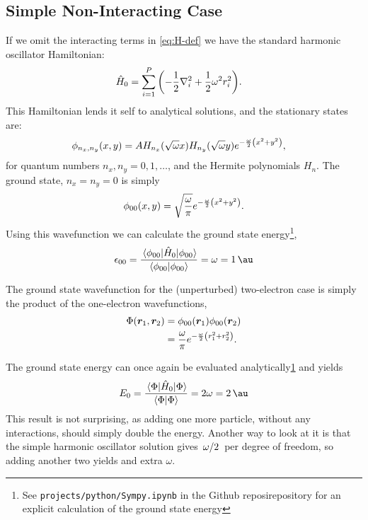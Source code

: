 \documentclass[a4paper, 11pt]{article}
\begin{document}
\begin{multicols}{2}
    \subsection{Simple Non-Interacting Case}
    If we omit the interacting terms in \autoref{eq:H-def} we have
    the standard harmonic oscillator Hamiltonian:
    \begin{align}
        \hat H_0 &= \sum_{i=1}^P\qty(-\frac{1}{2}\laplacian_i +
        \frac{1}{2}\omega^2 r_i^2).
    \end{align}
    This Hamiltonian lends it self to analytical solutions, and the stationary
    states are:
    \begin{align}
        \phi_{n_x, n_y}(x, y) &= A H_{n_x}(\sqrt\omega x)H_{n_y}(\sqrt\omega y)
        e^{-\frac{\omega}{2}\qty(x^2 + y^2)},
    \end{align} 
    for quantum numbers $n_x, n_y = 0, 1,\dots$, and the Hermite polynomials
    $H_n$. The ground state, $n_x=n_y=0$ is simply
    \begin{align}
        \phi_{00}(x,y) =
        \sqrt{\frac{\omega}{\pi}}e^{-\frac{\omega}{2}\qty(x^2+y^2)}.
    \end{align}
    Using this wavefunction we can calculate the ground state
    energy\footnote{\label{fnt:sympy}See \texttt{projects/python/Sympy.ipynb} in the Github
    reposirepository for an explicit calculation of the ground state energy},
    \begin{align}
        \epsilon_{00} = \frac{\expval{\hat H_0}{\phi_{00}}}{\braket{\phi_{00}}}
        = \omega = \SI{1}{\au}
    \end{align}

    The ground state wavefunction for the (unperturbed) two-electron case is simply the
    product of the one-electron wavefunctions,
    \begin{align}
        \begin{split}
            \Phi(\bm r_1, \bm r_2) &= \phi_{00}(\bm r_1)\phi_{00}(\bm r_2)\\
            &= \frac{\omega}{\pi} e^{-\frac{\omega}{2}\qty(r_1^2+r_2^2)}.
        \end{split}\label{eq:Phi-non-inter}
    \end{align}

    The ground state energy can once again be evaluated
    analytically\cref{fnt:sympy} and yields
    \begin{align}
        E_0 = \frac{\expval{\hat H_0}{\Phi}}{\braket{\Phi}}
        = 2\omega =\SI{2}{\au}
    \end{align}
    This result is not surprising, as adding one more particle, without any
    interactions, should simply double the energy. Another way to look at it is
    that the simple harmonic oscillator solution gives $\flatfrac{\omega}{2}$
    per degree of freedom, so adding another two yields and extra $\omega$.



\end{multicols}
\end{document}
